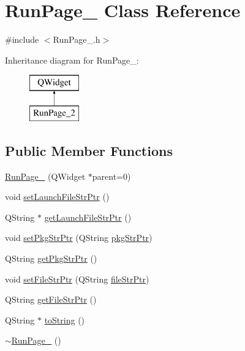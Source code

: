\hypertarget{class_run_page__2}{\section{Run\-Page\-\_ Class Reference}
\label{class_run_page__2}
}


{\ttfamily \#include $<$Run\-Page\-\_.\-h$>$}

Inheritance diagram for Run\-Page\-\_\-:\begin{figure}[H]
\begin{center}
\leavevmode
\includegraphics[height=2.000000cm]{class_run_page__2}
\end{center}
\end{figure}
\subsection*{Public Member Functions}
\begin{DoxyCompactItemize}
\item 
\hyperlink{class_run_page__2_a6c183b2d481d952509f2b1f97d48bc8d}{Run\-Page\-\_} (Q\-Widget $\ast$parent=0)
\item 
void \hyperlink{class_run_page__2_ad351ea26fe784be1bfa2cee01a62fd06}{set\-Launch\-File\-Str\-Ptr} ()
\item 
Q\-String $\ast$ \hyperlink{class_run_page__2_af4529d1908e4311aa55cb6dada692d5b}{get\-Launch\-File\-Str\-Ptr} ()
\item 
void \hyperlink{class_run_page__2_a7ff34f5f0843a73d133ccdb5e1e3b8a6}{set\-Pkg\-Str\-Ptr} (Q\-String \hyperlink{class_run_page__2_a3cb53dcb4a7355f093c49485c0e72b6c}{pkg\-Str\-Ptr})
\item 
Q\-String \hyperlink{class_run_page__2_a45ed6f2c043d93e2efb92b6c428f5211}{get\-Pkg\-Str\-Ptr} ()
\item 
void \hyperlink{class_run_page__2_a553489345f8c833a9017e4bbfe23ef14}{set\-File\-Str\-Ptr} (Q\-String \hyperlink{class_run_page__2_a38819f2c591cbab6a3ab8d52d9d3c2c3}{file\-Str\-Ptr})
\item 
Q\-String \hyperlink{class_run_page__2_a8ae3d6e9d5b98ed88e6d5dafc19df4ed}{get\-File\-Str\-Ptr} ()
\item 
Q\-String $\ast$ \hyperlink{class_run_page__2_aaa22876a2b0f169032877d88e4d2dfe8}{to\-String} ()
\item 
\hyperlink{class_run_page__2_a430898ec1742595342124faf51be2690}{$\sim$\-Run\-Page\-\_} ()
\end{DoxyCompactItemize}
